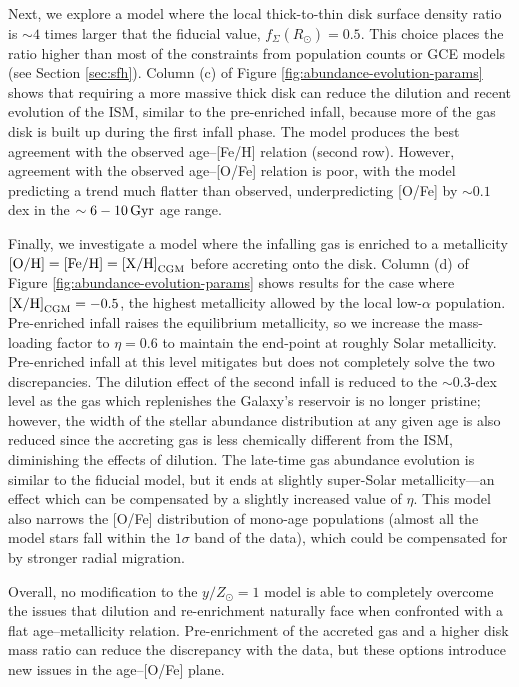 \documentclass[twocolumn,twocolappendix,linenumbers]{aastex631}
\newcommand{\mathOH}{{\rm [O/H]}}
\newcommand{\mathFeH}{{\rm [Fe/H]}}
\newcommand{\yZ}[1]{$y/Z_\odot=#1$}
\newcommand{\Gyr}{\,{\rm Gyr}}
\begin{document}
Next, we explore a model where the local thick-to-thin disk surface density ratio is $\sim4$ times larger that the fiducial value, $f_\Sigma(R_\odot)=0.5$. This choice places the ratio higher than most of the constraints from population counts or GCE models (see Section \ref{sec:sfh}). Column (c) of Figure \ref{fig:abundance-evolution-params} shows that requiring a more massive thick disk can reduce the dilution and recent evolution of the ISM, similar to the pre-enriched infall, because more of the gas disk is built up during the first infall phase. The model produces the best agreement with the observed age--[Fe/H] relation (second row). However, agreement with the observed age--[O/Fe] relation is poor, with the model predicting a trend much flatter than observed, underpredicting [O/Fe] by $\sim0.1$ dex in the $\sim6-10\Gyr$ age range.

Finally, we investigate a model where the infalling gas is enriched to a metallicity $\mathOH=\mathFeH={\rm [X/H]}_{\rm CGM}$ before accreting onto the disk. Column (d) of Figure \ref{fig:abundance-evolution-params} shows results for the case where ${\rm [X/H]}_{\rm CGM}=-0.5$, the highest metallicity allowed by the local low-$\alpha$ population. Pre-enriched infall raises the equilibrium metallicity, so we increase the mass-loading factor to $\eta=0.6$ to maintain the end-point at roughly Solar metallicity. Pre-enriched infall at this level mitigates but does not completely solve the two discrepancies. The dilution effect of the second infall is reduced to the $\sim0.3$-dex level as the gas which replenishes the Galaxy's reservoir is no longer pristine; however, the width of the stellar abundance distribution at any given age is also reduced since the accreting gas is less chemically different from the ISM, diminishing the effects of dilution. The late-time gas abundance evolution is similar to the fiducial model, but it ends at slightly super-Solar metallicity---an effect which can be compensated by a slightly increased value of $\eta$. This model also narrows the [O/Fe] distribution of mono-age populations (almost all the model stars fall within the $1\sigma$ band of the data), which could be compensated for by stronger radial migration.

Overall, no modification to the \yZ{1} model is able to completely overcome the issues that dilution and re-enrichment naturally face when confronted with a flat age--metallicity relation. Pre-enrichment of the accreted gas and a higher disk mass ratio can reduce the discrepancy with the data, but these options introduce new issues in the age--[O/Fe] plane. 
\end{document}
